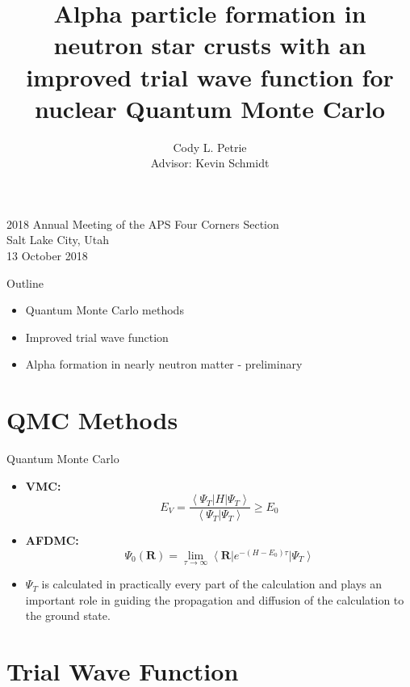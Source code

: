 \documentclass{beamer}
\title[Alpha formation in QMC]{Alpha particle formation in neutron star crusts with an improved trial wave function for nuclear Quantum Monte Carlo}
\author[Cody L. Petrie, cody.petrie@asu.edu]{Cody L. Petrie\\
Advisor: Kevin Schmidt}
\institute{Arizona State University \\ Tempe, AZ}
\date{}
\newcommand{\ket}[1]{\left| #1 \right>}
\newcommand{\bra}[1]{\left< #1 \right|}
\newcommand{\braket}[2]{\left< #1 | #2 \right>}
\newcommand{\R}{\mathbf{R}}
\begin{document}
\begin{frame}
   \titlepage
   \centering
   \vspace{-1.0cm}
   \small
2018 Annual Meeting of the APS Four Corners Section \\
Salt Lake City, Utah \\
13 October 2018
\end{frame}

\begin{frame}{Outline}
\begin{itemize}
   \item Quantum Monte Carlo methods
   \item Improved trial wave function
   \item Alpha formation in nearly neutron matter - preliminary
\end{itemize}
\end{frame}

\section{QMC Methods}
\begin{frame}{Quantum Monte Carlo}
\begin{itemize}
   \item \textbf{VMC:}
   \begin{equation*}
      E_V = \frac{\bra{\Psi_T}H\ket{\Psi_T}}{\braket{\Psi_T}{\Psi_T}} \ge E_0
   \end{equation*}
   \item \textbf{AFDMC:}
   \begin{equation*}
      \Psi_0(\R) = \lim\limits_{\tau\rightarrow\infty}\bra{\R}e^{-(H-E_0)\tau}\ket{\Psi_T}
   \end{equation*}
   \item $\Psi_T$ is calculated in practically every part of the calculation and plays an important role in guiding the propagation and diffusion of the calculation to the ground state.
\end{itemize}
\end{frame}

\section{Trial Wave Function}
\end{document}
